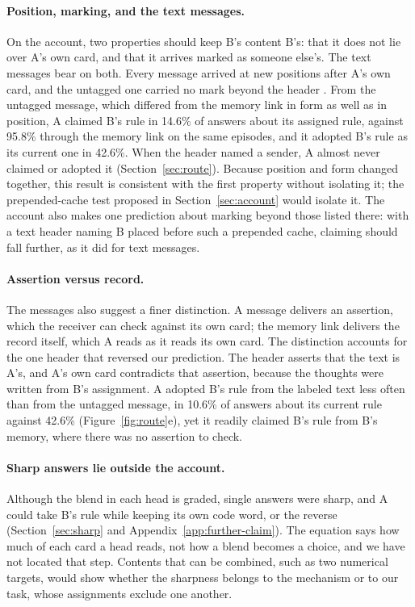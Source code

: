 \paragraph{Position, marking, and the text messages.} On the account,
two properties should keep B's content B's: that it does not lie over
A's own card, and that it arrives marked as someone else's. The text
messages bear on both. Every message arrived at new positions after A's
own card, and the untagged one carried no mark beyond the header
. From the untagged message, which differed
from the memory link in form as well as in position, A claimed B's rule
in 14.6\% of answers about its assigned rule, against 95.8\% through the
memory link on the same episodes, and it adopted B's rule as its current
one in 42.6\%. When the header named a sender, A almost never claimed or
adopted it (Section~\ref{sec:route}). Because position and form changed
together, this result is consistent with the first property without
isolating it; the prepended-cache test proposed in
Section~\ref{sec:account} would isolate it. The account also makes one
prediction about marking beyond those listed there: with a text header
naming B placed before such a prepended cache, claiming should fall
further, as it did for text messages.

\paragraph{Assertion versus record.} The messages also suggest a finer
distinction. A message delivers an assertion, which the receiver can
check against its own card; the memory link delivers the record itself,
which A reads as it reads its own card. The distinction accounts for the
one header that reversed our prediction. The header  asserts that the text is A's, and A's own card contradicts
that assertion, because the thoughts were written from B's assignment.
A adopted B's rule from the labeled text less often than from the
untagged message, in 10.6\% of answers about its current rule against
42.6\% (Figure~\ref{fig:route}e), yet it readily claimed B's rule from
B's memory, where there was no assertion to check.

\paragraph{Sharp answers lie outside the account.} Although the blend in
each head is graded, single answers were sharp, and A could take B's
rule while keeping its own code word, or the reverse
(Section~\ref{sec:sharp} and Appendix~\ref{app:further-claim}). The equation
says how much of each card a head reads, not how a blend becomes a
choice, and we have not located that step. Contents that can be
combined, such as two numerical targets, would show whether the
sharpness belongs to the mechanism or to our task, whose assignments
exclude one another.

